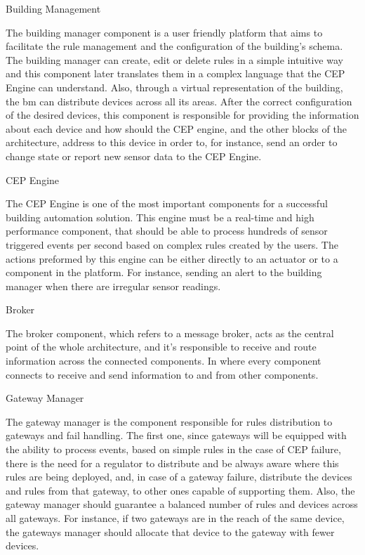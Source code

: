 \begin{Paragraph}{Building Management}
	
	The building manager component is a user friendly platform that aims to facilitate the rule management and the configuration of the building's schema. The building manager can create, edit  or delete rules in a simple intuitive way and this component later translates them in a complex language that the CEP Engine can understand. Also, through a virtual representation of the building, the \ac{bm} can distribute devices across all its areas. After the correct configuration of the desired devices, this component is responsible for providing the information about each device and how should the CEP engine, and the other blocks of the architecture, address to this device in order to, for instance, send an order to change state or report new sensor data to the CEP Engine.
	
\end{Paragraph}

\begin{Paragraph}{CEP Engine}
	
	The CEP Engine is one of the most important components for a successful building automation solution. This engine must be a real-time and high performance component, that should be able to process hundreds of sensor triggered events per second based on complex rules created by the users. The actions preformed by this engine can be either directly to an actuator or to a component in the platform. For instance, sending an alert to the building manager when there are irregular sensor readings.
	
	
\end{Paragraph}

\begin{Paragraph}{Broker}
	
	The broker component, which refers to a message broker, acts as the central point of the whole architecture, and it's responsible to receive and route information across the connected components. In where every component connects to receive and send information to and from other components.
	
\end{Paragraph}

\begin{Paragraph}{Gateway Manager}
	
	The gateway manager is the component responsible for rules distribution to gateways and fail handling. The first one, since gateways will be equipped with the ability to process events, based on simple rules in the case of CEP failure, there is the need for a regulator to distribute and be always aware where this rules are being deployed, and, in case of a gateway failure, distribute the devices and rules from that gateway, to other ones capable of supporting them. Also, the gateway manager should guarantee a balanced number of rules and devices across all gateways. For instance, if two gateways are in the reach of the same device, the gateways manager should allocate that device to the gateway with fewer devices.
	
	
\end{Paragraph}

